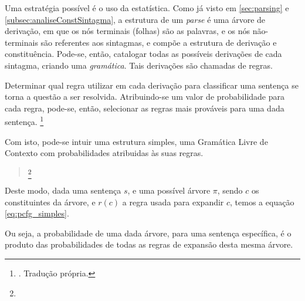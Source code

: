 Uma estratégia possível é o uso da estatística. Como já visto em \ref{sec:parsing} e \ref{subsec:analiseConstSintagma}, a estrutura de um \textit{parse} é uma árvore de derivação, em que os nós terminais (folhas) são as palavras, e os nós não-terminais são referentes aos sintagmas, e compõe a estrutura de derivação e constituência. Pode-se, então, catalogar todas as possíveis derivações de cada sintagma, criando uma \textit{gramática}. Tais derivações são chamadas de regras.

Determinar qual regra utilizar em cada derivação para classificar uma sentença se torna a questão a ser resolvida. Atribuindo-se um valor de probabilidade para cada regra, pode-se, então, selecionar as regras mais prováveis para uma dada sentença.  
\footnote{. Tradução própria.}

Com isto, pode-se intuir uma estrutura simples, uma Gramática Livre de Contexto com probabilidades atribuidas às suas regras. \cite[p~382]{Manning1999FoundationsNLP}
\begin{quote}
    \footnote{}
\end{quote}
    
Deste modo, dada uma sentença $s$, e uma possível árvore $\pi$, sendo $c$ os constituintes da árvore, e $r(c)$ a regra usada para expandir $c$, temos a equação \ref{eq:pcfg_simples}.
\begin{center}
       
\end{center}
Ou seja, a probabilidade de uma dada árvore, para uma sentença específica, é o produto das probabilidades de todas as regras de expansão desta mesma árvore.

